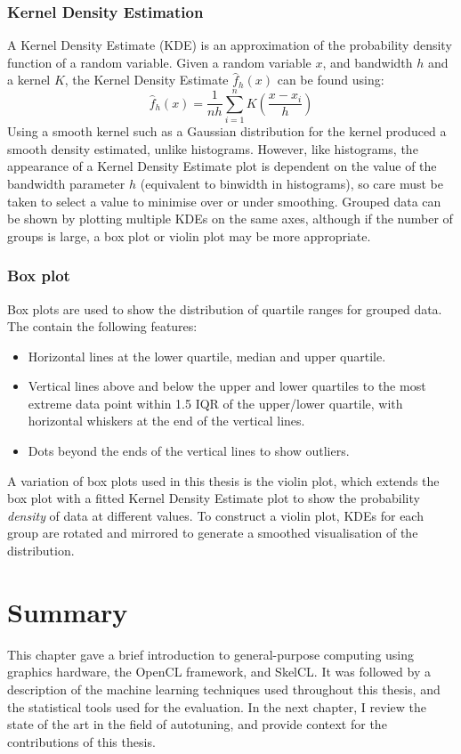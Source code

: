 \subsubsection{Kernel Density Estimation}

A Kernel Density Estimate (KDE) is an approximation of the probability
density function of a random variable. Given a random variable $x$,
and bandwidth $h$ and a kernel $K$, the Kernel Density Estimate
$\hat{f}_h(x)$ can be found using:
%
\begin{equation}
  \hat{f}_h(x) = \frac{1}{nh} \sum^{n}_{i=1} K\left( \frac{x - x_i}{h} \right)
\end{equation}
%
Using a smooth kernel such as a Gaussian distribution for the kernel
produced a smooth density estimated, unlike histograms. However, like
histograms, the appearance of a Kernel Density Estimate plot is
dependent on the value of the bandwidth parameter $h$ (equivalent to
binwidth in histograms), so care must be taken to select a value to
minimise over or under smoothing. Grouped data can be shown by
plotting multiple KDEs on the same axes, although if the number of
groups is large, a box plot or violin plot may be more appropriate.


\subsubsection{Box plot}

Box plots are used to show the distribution of quartile ranges for
grouped data. The contain the following features:

\begin{itemize}
\item Horizontal lines at the lower quartile, median and upper
  quartile.
\item Vertical lines above and below the upper and lower quartiles to
  the most extreme data point within 1.5 IQR of the upper/lower
  quartile, with horizontal whiskers at the end of the vertical lines.
\item Dots beyond the ends of the vertical lines to show outliers.
\end{itemize}

A variation of box plots used in this thesis is the violin plot, which
extends the box plot with a fitted Kernel Density Estimate plot to
show the probability \emph{density} of data at different values. To
construct a violin plot, KDEs for each group are rotated and mirrored
to generate a smoothed visualisation of the distribution.


\section{Summary}

This chapter gave a brief introduction to general-purpose computing
using graphics hardware, the OpenCL framework, and SkelCL. It was
followed by a description of the machine learning techniques used
throughout this thesis, and the statistical tools used for the
evaluation. In the next chapter, I review the state of the art in the
field of autotuning, and provide context for the contributions of this
thesis.
